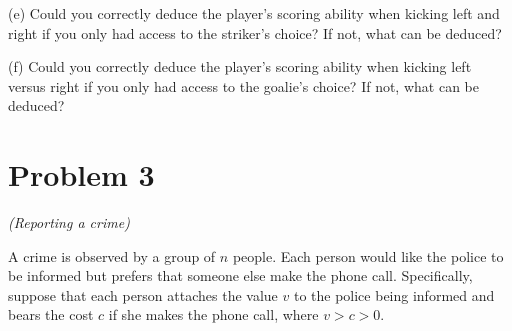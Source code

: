 \documentclass{article}
\begin{document}
(e) Could you correctly deduce the player’s scoring ability when kicking left and right if you only
had access to the striker’s choice? If not, what can be deduced?

(f) Could you correctly deduce the player’s scoring ability when kicking left versus right if you only
had access to the goalie’s choice? If not, what can be deduced?





\section{Problem 3} \textit{(Reporting a crime)}

A crime is observed by a group of $n$ people. Each person would like the police to be informed
but prefers that someone else make the phone call. Specifically, suppose that each person
attaches the value $v$ to the police being informed and bears the cost $c$ if she makes the
phone call, where $v > c > 0$.
\end{document}
